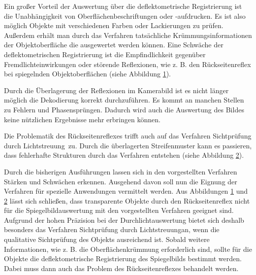 \noindent
Ein großer Vorteil der Auswertung über die deflektometrische Registrierung ist die Unabhängigkeit von Oberflächenbeschriftungen oder -aufdrucken.
Es ist also möglich Objekte mit verschiedenen Farben oder Lackierungen zu prüfen.
Außerdem erhält man durch das Verfahren tatsächliche Krümmungsinformationen der Objektoberfläche die ausgewertet werden können.
Eine Schwäche der deflektometrischen Registrierung ist die Empfindlichkeit gegenüber Fremdlichteinwirkungen oder störende Reflexionen, wie z. B. den Rückseitenreflex bei spiegelnden Objektoberflächen (siehe Abbildung \ref{tikz:abbRückseitenreflexRegistrierung}).

{
	\begin{figure}[H]
		\centering
		
		\label{tikz:abbRückseitenreflexRegistrierung}
	\end{figure}
}

\noindent
Durch die Überlagerung der Reflexionen im Kamerabild ist es nicht länger möglich die Dekodierung korrekt durchzuführen.
Es kommt an manchen Stellen zu Fehlern und Phasensprüngen.
Dadurch wird auch die Auswertung des Bildes keine nützlichen Ergebnisse mehr erbringen können.

\p
Die Problematik des Rückseitenreflexes trifft auch auf das Verfahren \glqq Sichtprüfung durch Lichtstreuung\grqq ~zu.
Durch die überlagerten Streifenmuster kann es passieren, dass fehlerhafte Strukturen durch das Verfahren entstehen (siehe Abbildung \ref{tikz:abbRückseitenreflexLichtstreuung}).

{
	\begin{figure}[H]
		\centering
		
		\label{tikz:abbRückseitenreflexLichtstreuung}
	\end{figure}
}

\noindent
Durch die bisherigen Ausführungen lassen sich in den vorgestellten Verfahren Stärken und Schwächen erkennen.
Ausgehend davon soll nun die Eignung der Verfahren für spezielle Anwendungen vermittelt werden.
Aus Abbildungen \ref{tikz:abbRückseitenreflexRegistrierung} und \ref{tikz:abbRückseitenreflexLichtstreuung} lässt sich schließen, dass transparente Objekte durch den Rückseitenreflex nicht für die Spiegelbildauswertung mit den vorgestellten Verfahren geeignet sind.
Aufgrund der hohen Präzision bei der Durchlichtauswertung bietet sich deshalb besonders das Verfahren \glqq Sichtprüfung durch Lichtstreuung\grqq an, wenn die qualitative Sichtprüfung des Objekts ausreichend ist.
Sobald weitere Informationen, wie z. B. die Oberflächenkrümmung erforderlich sind, sollte für die Objekte die deflektometrische Registrierung des Spiegelbilds bestimmt werden.
Dabei muss dann auch das Problem des Rückseitenreflexes behandelt werden.

